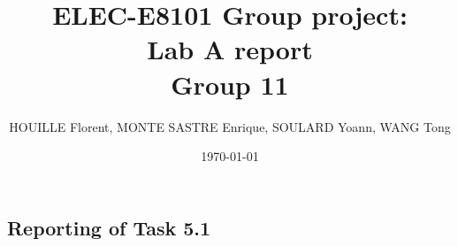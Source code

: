 \documentclass[11pt]{article}
\title{\Huge ELEC-E8101 Group project: \\ Lab A report \\ Group 11}
\date{\today}
\author{HOUILLE Florent, MONTE SASTRE Enrique, SOULARD Yoann, WANG Tong}
\begin{document}
\maketitle

\subsection*{Reporting of Task 5.1}

\end{document}
